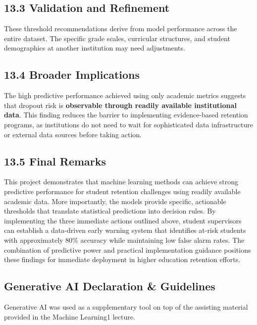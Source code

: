 \documentclass[
]{article}
\begin{document}
\subsection{13.3 Validation and
Refinement}\label{validation-and-refinement}

These threshold recommendations derive from model performance across the
entire dataset. The specific grade scales, curricular structures, and
student demographics at another institution may need adjustments.

\subsection{13.4 Broader Implications}\label{broader-implications}

The high predictive performance achieved using only academic metrics
suggests that dropout risk is \textbf{observable through readily
available institutional data}. This finding reduces the barrier to
implementing evidence-based retention programs, as institutions do not
need to wait for sophisticated data infrastructure or external data
sources before taking action.

\subsection{13.5 Final Remarks}\label{final-remarks}

This project demonstrates that machine learning methods can achieve
strong predictive performance for student retention challenges using
readily available academic data. More importantly, the models provide
specific, actionable thresholds that translate statistical predictions
into decision rules. By implementing the three immediate actions
outlined above, student supervisors can establish a data-driven early
warning system that identifies at-risk students with approximately 80\%
accuracy while maintaining low false alarm rates. The combination of
predictive power and practical implementation guidance positions these
findings for immediate deployment in higher education retention efforts.

\subsection{Generative AI Declaration \&
Guidelines}\label{generative-ai-declaration-guidelines}

Generative AI was used as a supplementary tool on top of the assisting
material provided in the Machine Learning1 lecture.
\end{document}
